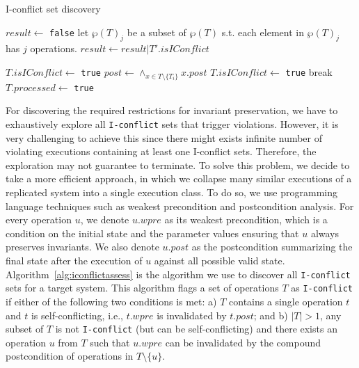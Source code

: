\begin{algorithm}[th!]
\caption{I-conflict set discovery}
\label{alg:iconflictassess}
\begin{algorithmic}[1]


  \Return
\EndIf

\State $result \leftarrow $ {\tt false} 
\State let $\wp(T)_{j}$ be a subset of $\wp(T)$ s.t. each element in $\wp(T)_{j}$ has $j$ operations.
    \State $result \leftarrow result | T'.isIConflict$
 \EndFor
\EndFor

 
  
    
     \State $T.isIConflict \leftarrow$ {\tt true}
   \EndIf
    
     \State $post \leftarrow \wedge _{x \in T\setminus{\{T_i\}}} x.post$
        \State $T.isIConflict \leftarrow$ {\tt true}
        \State break
     \EndIf
   \EndFor
 \EndIf
\EndIf
\State $T.processed \leftarrow$ {\tt true}
\EndFunction
\end{algorithmic}
\end{algorithm}

For discovering the required restrictions for invariant preservation, we have
to exhaustively explore all {\tt I-conflict} sets that trigger violations. However,
it is very challenging to achieve this since there might exists infinite number of
violating executions containing at least one I-conflict sets. Therefore, the exploration may not guarantee to terminate.
To solve this problem, we decide to take a more efficient approach,
in which we collapse many similar executions of a replicated system into a single
execution class. To do so, we use programming language techniques such as
weakest precondition and postcondition analysis. For every operation $u$, we denote
$u.wpre$ as its weakest precondition, which is a condition on
the initial state and the parameter values ensuring that $u$
always preserves invariants. We also denote $u.post$ as the postcondition summarizing
the final state after the execution of $u$ against all possible valid state. Algorithm~\ref{alg:iconflictassess}
is the algorithm we use to discover all {\tt I-conflict} sets for a target system. This algorithm
flags a set of operations $T$ as {\tt I-conflict} if either of the following two conditions is met:
a) $T$ contains a single operation $t$ and $t$ is self-conflicting, i.e., $t.wpre$ is
invalidated by $t.post$; and b) $|T| > 1$, any subset of $T$ is not {\tt I-conflict} (but
can be self-conflicting) and there exists an operation $u$ from $T$ such that $u.wpre$
can be invalidated by the compound postcondition of operations in $T\setminus \{u\}$.

